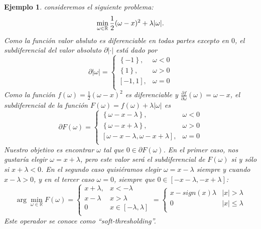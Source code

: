 \documentclass[12pt,draftcls, onecolumn, letterpaper,compsoc]{IEEEtran}
\newtheorem{example}{\textbf{Ejemplo}}
\begin{document}
\begin{example}
    consideremos el siguiente problema:
    \begin{displaymath}
        \min_{\omega\in \mathbb{R}} \frac{1}{2}(\omega - x)^{2} + \lambda|\omega|.\\
    \end{displaymath}
    Como la funci\'{o}n valor absluto es diferenciable en todas partes excepto en $0$, el subdiferencial del valor absoluto $\partial |\cdot|$ est\'{a} dado por
    \begin{displaymath}
        \partial |\omega| = \left\lbrace\begin{array}{ll}
            \left\lbrace-1\right\rbrace, & \omega < 0\\
            \left\lbrace 1\right\rbrace, & \omega > 0\\
            \left[-1, 1\right], & \omega = 0\\
        \end{array}\right.
    \end{displaymath}
    Como la funci\'{o}n $f(\omega)=\frac{1}{2}(\omega - x)^{2}$ es diferenciable y $\frac{\partial f}{\partial \omega}(\omega) = \omega - x$, el subdiferencial de la funci\'{o}n $F(\omega) = f(\omega) + \lambda|\omega|$ es
    \begin{displaymath}
        \partial F(\omega) = \left\lbrace\begin{array}{ll}
            \left\lbrace\omega-x-\lambda\right\rbrace, & \omega < 0\\
            \left\lbrace\omega-x+ \lambda\right\rbrace, & \omega > 0\\
            \left[\omega-x-\lambda, \omega-x+\lambda\right], & \omega = 0\\
        \end{array}\right.
    \end{displaymath}
    Nuestro objetivo es encontrar $\omega$ tal que $0\in \partial F(\omega)$. En el primer caso, nos gustar\'{i}a elegir $\omega = x+\lambda$, pero este valor ser\'{a} el subdiferencial de $F(\omega)$ si y s\'{o}lo si $x+\lambda<0$. En el segundo caso quisi\'{e}ramos elegir $\omega = x-\lambda$ siempre y cuando $x-\lambda>0$, y en el tercer caso $\omega=0$, siempre que $0\in[-x-\lambda,-x+\lambda]$:
    \begin{displaymath}
        \arg\min_{\omega \in \mathbb{R}} F(\omega) = \left\lbrace\begin{array}{ll}
            x+\lambda, & x < -\lambda\\
            x-\lambda & x > \lambda\\
            0 & x\in\left[ -\lambda, \lambda\right]\\
        \end{array}\right. = \left\lbrace\begin{array}{ll}
            x-sign(x)\lambda & |x|>\lambda\\
            0 & |x|\leq \lambda\\
        \end{array}\right.
    \end{displaymath}
    Este operador se conoce como ``soft-thresholding''.
\end{example}
\end{document}
